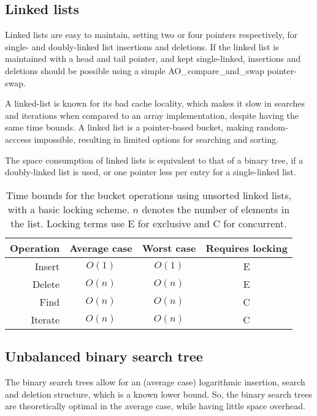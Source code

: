 \subsection{Linked lists}
Linked lists are easy to maintain, setting two or four pointers respectively, for
single- and doubly-linked list insertions and deletions.
If the linked list is maintained with a {\keyword head} and {\keyword tail} pointer,
and kept single-linked, insertions and deletions should be possible
using a simple {\keyword AO\_compare\_and\_swap} pointer-swap.

A linked-list is known for its bad cache locality, which makes it slow in
searches and iterations when compared to an array implementation, despite
having the same time bounds. A linked list is a pointer-based bucket, making
random-acccess impossible, resulting in limited options for searching and
sorting.

The space consumption of linked lists is equivalent to that of a binary tree,
if a doubly-linked list is used, or one pointer less per entry for a
single-linked list.

\begin{table}[h!]
    \centering
    \begin{tabular}[here]{ r || c | c | c}
        Operation & Average case & Worst case & Requires locking  \\ \hline
        Insert    & $O(1)$ & $O(1)$   & E  \\ \hline
        Delete    & $O(n)$ & $O(n)$   & E \\ \hline
        Find      & $O(n)$ & $O(n)$   & C  \\ \hline
        Iterate   & $O(n)$ & $O(n)$   & C  \\ \hline
    \end{tabular}
    \caption{Time bounds for the bucket operations using unsorted linked lists,
    with a basic locking scheme. $n$ denotes the number of elements in the
    list. Locking terms use E for exclusive and C for concurrent.}
    \label{tab:bounds:linked list}
\end{table}

\subsection{Unbalanced binary search tree}
The binary search trees allow for an (average case) logarithmic insertion,
search and deletion structure, which is a known lower bound. So, the binary
search trees are theoretically optimal in the average case, while having little
space overhead.

